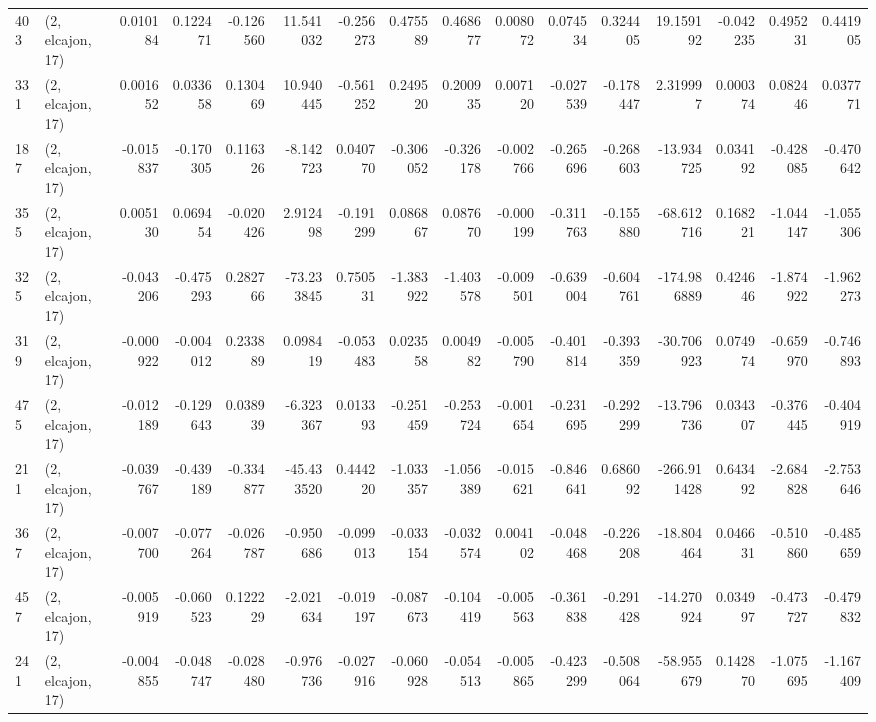 \begin{tabular}{llrrrrrrrrrrrrrr}
403 &  (2, elcajon, 17) &   0.010184 &  0.122471 & -0.126560 &   11.541032 & -0.256273 &   0.475589 &  0.468677 &  0.008072 &  0.074534 &  0.324405 &   19.159192 & -0.042235 &  0.495231 &  0.441905 \\
331 &  (2, elcajon, 17) &   0.001652 &  0.033658 &  0.130469 &   10.940445 & -0.561252 &   0.249520 &  0.200935 &  0.007120 & -0.027539 & -0.178447 &    2.319997 &  0.000374 &  0.082446 &  0.037771 \\
187 &  (2, elcajon, 17) &  -0.015837 & -0.170305 &  0.116326 &   -8.142723 &  0.040770 &  -0.306052 & -0.326178 & -0.002766 & -0.265696 & -0.268603 &  -13.934725 &  0.034192 & -0.428085 & -0.470642 \\
355 &  (2, elcajon, 17) &   0.005130 &  0.069454 & -0.020426 &    2.912498 & -0.191299 &   0.086867 &  0.087670 & -0.000199 & -0.311763 & -0.155880 &  -68.612716 &  0.168221 & -1.044147 & -1.055306 \\
325 &  (2, elcajon, 17) &  -0.043206 & -0.475293 &  0.282766 &  -73.233845 &  0.750531 &  -1.383922 & -1.403578 & -0.009501 & -0.639004 & -0.604761 & -174.986889 &  0.424646 & -1.874922 & -1.962273 \\
319 &  (2, elcajon, 17) &  -0.000922 & -0.004012 &  0.233889 &    0.098419 & -0.053483 &   0.023558 &  0.004982 & -0.005790 & -0.401814 & -0.393359 &  -30.706923 &  0.074974 & -0.659970 & -0.746893 \\
475 &  (2, elcajon, 17) &  -0.012189 & -0.129643 &  0.038939 &   -6.323367 &  0.013393 &  -0.251459 & -0.253724 & -0.001654 & -0.231695 & -0.292299 &  -13.796736 &  0.034307 & -0.376445 & -0.404919 \\
211 &  (2, elcajon, 17) &  -0.039767 & -0.439189 & -0.334877 &  -45.433520 &  0.444220 &  -1.033357 & -1.056389 & -0.015621 & -0.846641 &  0.686092 & -266.911428 &  0.643492 & -2.684828 & -2.753646 \\
367 &  (2, elcajon, 17) &  -0.007700 & -0.077264 & -0.026787 &   -0.950686 & -0.099013 &  -0.033154 & -0.032574 &  0.004102 & -0.048468 & -0.226208 &  -18.804464 &  0.046631 & -0.510860 & -0.485659 \\
457 &  (2, elcajon, 17) &  -0.005919 & -0.060523 &  0.122229 &   -2.021634 & -0.019197 &  -0.087673 & -0.104419 & -0.005563 & -0.361838 & -0.291428 &  -14.270924 &  0.034997 & -0.473727 & -0.479832 \\
241 &  (2, elcajon, 17) &  -0.004855 & -0.048747 & -0.028480 &   -0.976736 & -0.027916 &  -0.060928 & -0.054513 & -0.005865 & -0.423299 & -0.508064 &  -58.955679 &  0.142870 & -1.075695 & -1.167409 \\

\end{tabular}
